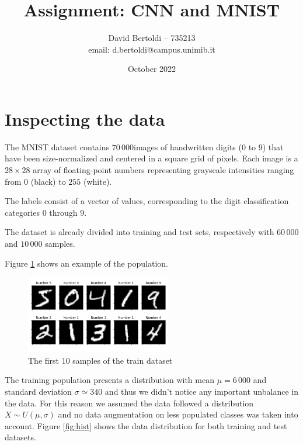 \documentclass[compsoc]{IEEEtran}
\title{Assignment: CNN and MNIST}
\author{David Bertoldi -- 735213 \\ email: d.bertoldi@campus.unimib.it}
\affil{Department of Informatics, Systems and Communication}
\affil{University of Milano-Bicocca}
\date{October 2022}
\begin{document}
\maketitle 



\section{Inspecting the data}\label{sec:insp}
The MNIST dataset contains $70\,000 $images of handwritten digits ($0$ to $9$) that have been size-normalized and centered in a square grid of pixels. Each image is a $28 \times 28$ array of floating-point numbers representing grayscale intensities ranging from $0$ (black) to $255$ (white). \par
The labels consist of a vector of values, corresponding to the digit classification categories $0$ through $9$. \par
The dataset is already divided into training and test sets, respectively with $60\,000$ and $10\,000$ samples. \par

Figure \ref{fig:data} shows an example of the
population.

\begin{figure}[ht!]
\centering                                                                        
\includegraphics[width=2.5in]{data.png}
\captionsetup{justification=centering}                                                                                         
\caption{The first 10 samples of the train dataset}
\label{fig:data}                                                                                                                               
\end{figure}




The training population presents a distribution with mean $\mu = 6\,000$ and standard deviation $\sigma \simeq 340$ and thus we didn't notice any important unbalance in the data. For this reason we assumed the data followed a distribution $X \sim U(\mu, \sigma)$ and no data augmentation on less populated classes was taken into account. Figure \ref{fig:hist} shows the data distribution for both training and test datasets.
\end{document}
